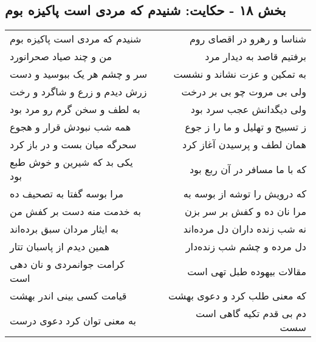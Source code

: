 \begin{center}
\section*{بخش ۱۸ - حکایت: شنیدم که مردی است پاکیزه بوم}
\label{sec:018}
\begin{longtable}{l p{0.5cm} r}
شنیدم که مردی است پاکیزه بوم
&&
شناسا و رهرو در اقصای روم
\\
من و چند صیاد صحرانورد
&&
برفتیم قاصد به دیدار مرد
\\
سر و چشم هر یک ببوسید و دست
&&
به تمکین و عزت نشاند و نشست
\\
زرش دیدم و زرع و شاگرد و رخت
&&
ولی بی مروت چو بی بر درخت
\\
به لطف و سخن گرم رو مرد بود
&&
ولی دیگدانش عجب سرد بود
\\
همه شب نبودش قرار و هجوع
&&
ز تسبیح و تهلیل و ما را ز جوع
\\
سحرگه میان بست و در باز کرد
&&
همان لطف و پرسیدن آغاز کرد
\\
یکی بد که شیرین و خوش طبع بود
&&
که با ما مسافر در آن ربع بود
\\
مرا بوسه گفتا به تصحیف ده
&&
که درویش را توشه از بوسه به
\\
به خدمت منه دست بر کفش من
&&
مرا نان ده و کفش بر سر بزن
\\
به ایثار مردان سبق برده‌اند
&&
نه شب زنده داران دل مرده‌اند
\\
همین دیدم از پاسبان تتار
&&
دل مرده و چشم شب زنده‌دار
\\
کرامت جوانمردی و نان دهی است
&&
مقالات بیهوده طبل تهی است
\\
قیامت کسی بینی اندر بهشت
&&
که معنی طلب کرد و دعوی بهشت
\\
به معنی توان کرد دعوی درست
&&
دم بی قدم تکیه گاهی است سست
\\
\end{longtable}
\end{center}
